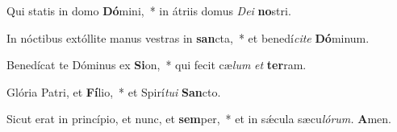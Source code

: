 \item Qui statis in domo \textbf{Dó}mini,~* in átriis domus \textit{Dei} \textbf{no}stri.
\item In nóctibus extóllite manus vestras in \textbf{san}cta,~* et benedí\textit{cite} \textbf{Dó}minum.
\item Benedícat te Dóminus ex \textbf{Si}on,~* qui fecit cæ\textit{lum} \textit{et} \textbf{ter}ram.
\item Glória Patri, et \textbf{Fí}lio,~* et Spirí\tinyhspace\textit{tui} \textbf{San}cto.
\item Sicut erat in princípio, et nunc, et \textbf{sem}per,~* et in sǽcula sæcu\tinyhspace\textit{lórum.} \textbf{A}men.
